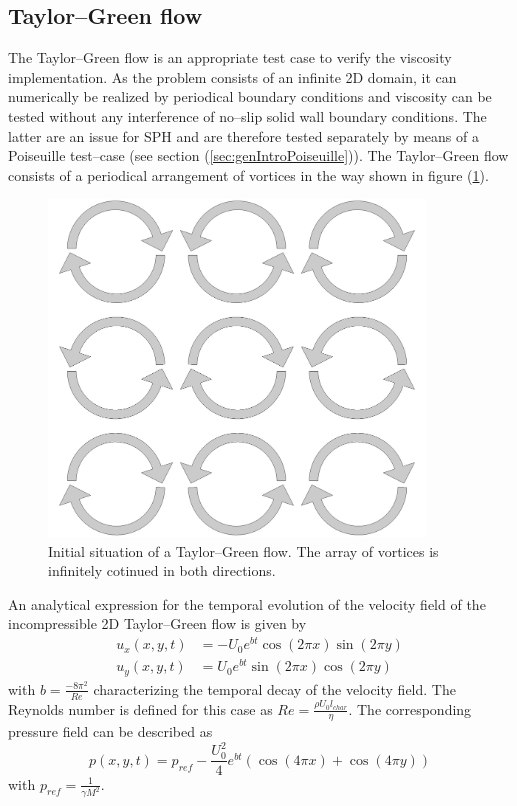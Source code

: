 \documentclass[11pt,a4paper,twoside]{report}
\begin{document}
\subsection{Taylor--Green flow}
\label{sec:GenIntro_TG}
The Taylor--Green flow is an appropriate test case to verify the viscosity implementation. As the problem consists of an infinite 2D domain, it can numerically be realized by periodical boundary conditions and viscosity can be tested without any interference of no--slip solid wall boundary conditions. The latter are an issue for SPH and are therefore tested separately by means of a Poiseuille test--case (see section (\ref{sec:genIntroPoiseuille})).
The Taylor--Green flow consists of a periodical arrangement of vortices in the way shown in figure (\ref{fig:GeneralSitu_TG}).
\begin{figure}
 \centering

\label{fig:GeneralSitu_TG}
\includegraphics[width=10cm]{Graphics/TestCases_genIntro/TG_genIntro}
\caption[Taylor--Green flow general presentation]{Initial situation of a Taylor--Green flow. The array of vortices is infinitely cotinued in both directions.}
\end{figure}

An analytical expression for the temporal evolution of the velocity field of the incompressible 2D Taylor--Green flow is given by \cite{Chaniotis2002}
\begin{equation}
 \label{eq:TG_analyticalSolution_u}
\begin{split}
u_x(x,y,t)&=-U_0 e^{bt}\cos(2\pi x)\sin(2\pi y)\\
u_y(x,y,t)&=U_0 e^{bt}\sin(2\pi x)\cos(2\pi y)
\end{split}
\end{equation}
with $b=\frac{-8\pi^2}{Re}$ characterizing the temporal decay of the velocity field. The Reynolds number is defined for this case as $Re=\frac{\rho U_0 l_\mathit{char}}{\eta}$.
The corresponding pressure field can be described as 
\begin{equation}
\label{eq:TG_analyticalSolution_p}
p(x,y,t)=p_\mathit{ref} -\frac{U_0^2}{4} e^{bt}\left(\cos(4\pi x)+\cos(4\pi y)\right)
\end{equation}
with $p_\mathit{ref}=\frac{1}{\gamma M^2}$.
\end{document}
